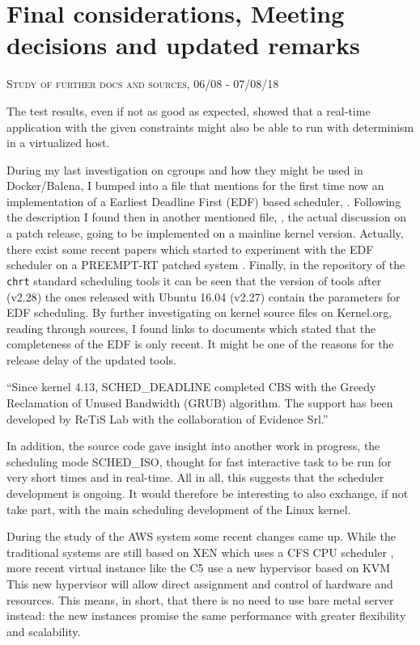\documentclass[]{scrartcl}
\begin{document}
\section{Final considerations, Meeting decisions and updated remarks}

{\small\textsc{Study of further docs and sources, 06/08 - 07/08/18} \bigskip}

The test results, even if not as good as expected, showed that a real-time application with the given constraints might also be able to run with determinism in a virtualized host.
 
During my last investigation on cgroups and how they might be used in Docker/Balena, I bumped into a file that mentions for the first time now an implementation of a Earliest Deadline First (EDF) based scheduler, \cite{kernel01}.
Following the description I found then in another mentioned file,
\cite{kernel02}, the actual discussion on a patch release, going to be implemented on a mainline kernel version. Actually, there exist some recent papers which started to experiment with the EDF scheduler on a PREEMPT-RT patched system \cite{Buelnaetal2017}.
Finally, in the repository of the \texttt{chrt} standard scheduling tools \cite{schtools01} it can be seen that the version of tools after (v2.28) the ones released with Ubuntu 16.04 (v2.27) contain the parameters for EDF scheduling.
By further investigating on kernel source files on Kernel.org, reading through sources, I found links to documents \cite{wiki01} which stated that the completeness of the EDF is only recent.
It might be one of the reasons for the release delay of the updated tools.
\bigskip

``Since kernel 4.13, SCHED\_DEADLINE completed CBS with the Greedy Reclamation of Unused Bandwidth (GRUB) algorithm. The support has been developed by ReTiS Lab with the collaboration of Evidence Srl.''
\bigskip

In addition, the source code gave insight into another work in progress, the scheduling mode SCHED\_ISO, thought for fast interactive task to be run for very short times and in real-time. All in all, this suggests that the scheduler development is ongoing.
It would therefore be interesting to also exchange, if not take part, with the main scheduling development of the Linux kernel.

During the study of the AWS system some recent changes came up. While the traditional systems are still based on XEN which uses a CFS CPU scheduler \cite{xen01}, more recent virtual instance like the C5 use a new hypervisor based on KVM \cite{amazon01} 
This new hypervisor will allow direct assignment and control of hardware and resources.
This means, in short, that there is no need to use bare metal server instead: the new instances promise the same performance with greater flexibility and scalability.
\end{document}
